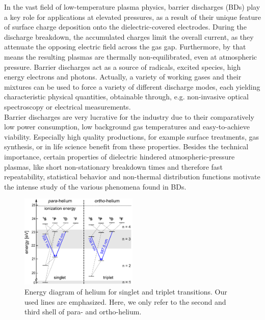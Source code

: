 \documentclass[a4paper,10pt,twoside]{article}
\begin{document}
		In the vast field of low-temperature plasma physics, barrier discharges (BDs) play a key role for applications at elevated pressures, as a result of their unique feature of surface charge deposition onto the dielectric-covered electrodes. During the discharge breakdown, the accumulated charges limit the overall current, as they attenuate the opposing electric field across the gas gap. Furthermore, by that means the resulting plasmas are thermally non-equilibrated, even at atmospheric pressure. Barrier discharges act as a source of radicals, excited species, high energy electrons and photons. Actually, a variety of working gases and their mixtures can be used to force a variety of different discharge modes, each yielding characteristic physical quantities, obtainable through, e.g. non-invasive optical spectroscopy or electrical measurements.\\
		Barrier discharges are very lucrative for the industry due to their comparatively low power consumption, low background gas temperatures and easy-to-achieve viability. Especially high quality productions, for example surface treatments, gas synthesis, or in life science benefit from these properties. Besides the technical importance, certain properties of dielectric hindered atmospheric-pressure plasmas, like short non-stationary breakdown times and therefore fast repeatability, statistical behavior and non-thermal distribution functions motivate the intense study of the various phenomena found in BDs.
		
				
			\begin{figure}[b!]
				\centering
				\hspace{-0.5cm}\includegraphics[width=0.5\textwidth]{figures/setup/He_energy_diagram.pdf}
				\caption{Energy diagram of helium for singlet and triplet transitions. Our used lines are emphasized. Here, we only refer to the second and third shell of para- and ortho-helium.}
				\label{img:termnschema}
			\end{figure}
				
\end{document}
